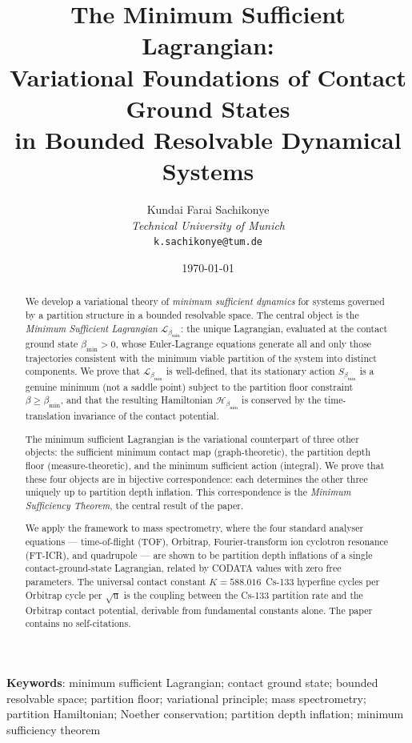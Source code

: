 \documentclass[12pt, a4paper]{article}
\title{\textbf{The Minimum Sufficient Lagrangian:\\
Variational Foundations of Contact Ground States\\
in Bounded Resolvable Dynamical Systems}}
\author{Kundai Farai Sachikonye\\
\textit{Technical University of Munich}\\
\texttt{k.sachikonye@tum.de}}
\date{\today}
\theoremstyle{plain}
\theoremstyle{definition}
\theoremstyle{remark}
\newcommand{\bmin}{\beta_{\min}}
\newcommand{\Lmin}{\mathcal{L}_{\bmin}}
\newcommand{\Smin}{S_{\bmin}}
\newcommand{\Hmin}{\mathcal{H}_{\bmin}}
\begin{document}
\maketitle

\begin{abstract}

We develop a variational theory of \emph{minimum sufficient dynamics} for
systems governed by a partition structure in a bounded resolvable space. The
central object is the \emph{Minimum Sufficient Lagrangian} $\Lmin$: the unique
Lagrangian, evaluated at the contact ground state $\bmin > 0$, whose
Euler-Lagrange equations generate all and only those trajectories consistent with
the minimum viable partition of the system into distinct components. We prove
that $\Lmin$ is well-defined, that its stationary action $\Smin$ is a genuine
minimum (not a saddle point) subject to the partition floor constraint
$\beta \geq \bmin$, and that the resulting Hamiltonian $\Hmin$ is conserved
by the time-translation invariance of the contact potential.

The minimum sufficient Lagrangian is the variational counterpart of three other
objects: the sufficient minimum contact map (graph-theoretic), the partition
depth floor (measure-theoretic), and the minimum sufficient action (integral).
We prove that these four objects are in bijective correspondence: each
determines the other three uniquely up to partition depth inflation. This
correspondence is the \emph{Minimum Sufficiency Theorem}, the central result of
the paper.

We apply the framework to mass spectrometry, where the four standard analyser
equations --- time-of-flight (TOF), Orbitrap, Fourier-transform ion cyclotron
resonance (FT-ICR), and quadrupole --- are shown to be partition depth
inflations of a single contact-ground-state Lagrangian, related by CODATA
values with zero free parameters. The universal contact constant
$K = 588.016$~Cs-133 hyperfine cycles per Orbitrap cycle per $\sqrt{\mathrm{u}}$
is the coupling between the Cs-133 partition rate and the Orbitrap contact
potential, derivable from fundamental constants alone. The paper contains
no self-citations.

\end{abstract}

\vspace{1em}
\noindent\textbf{Keywords}: minimum sufficient Lagrangian; contact ground state;
bounded resolvable space; partition floor; variational principle; mass
spectrometry; partition Hamiltonian; Noether conservation; partition depth
inflation; minimum sufficiency theorem
\end{document}
